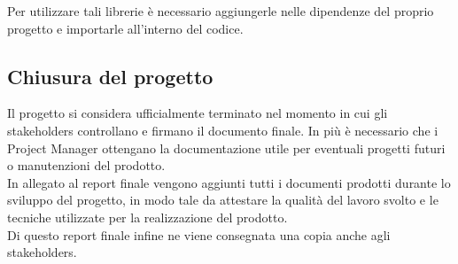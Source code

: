 Per utilizzare tali librerie è necessario aggiungerle nelle dipendenze del proprio progetto e importarle all'interno del codice.\\


\subsection{Chiusura del progetto}
Il progetto si considera ufficialmente terminato nel momento in cui gli stakeholders controllano e firmano il documento finale. In più è necessario
che i Project Manager ottengano la documentazione utile per eventuali progetti futuri o manutenzioni del prodotto.\\

In allegato al report finale vengono aggiunti tutti i documenti prodotti durante lo sviluppo del progetto, in modo tale da
attestare la qualità del lavoro svolto e le tecniche utilizzate per la realizzazione del prodotto.\\

Di questo report finale infine ne viene consegnata una copia anche agli stakeholders.